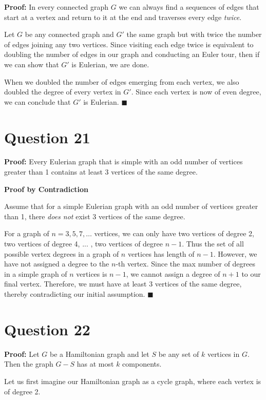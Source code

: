 \documentclass[11pt, oneside]{article}   	%
\newcommand*{\QEDA}{\hfill\ensuremath{\blacksquare}}         %
\begin{document}
{\textbf{Proof:} In every connected graph $G$ we can always find a sequences of edges that start at a vertex and return to it at the end and traverses every edge \textit{twice}.

Let $G$ be any connected graph and $G'$ the same graph but with twice the number of edges joining any two vertices. Since visiting each edge twice is equivalent to doubling the number of edges in our graph and conducting an Euler tour, then if we can show that $G'$ is Eulerian, we are done.

When we doubled the number of edges emerging from each vertex, we also doubled the degree of every vertex in $G'$. Since each vertex is now of even degree, we can conclude that $G'$ is Eulerian.  \QEDA


\section*{Question 21}

{\textbf{Proof:} Every Eulerian graph that is simple with an odd number of vertices greater than 1 contains at least 3 vertices of the same degree.

\textbf{Proof by Contradiction}

Assume that for a simple Eulerian graph with an odd number of vertices greater than 1, there \textit{does not} exist 3 vertices of the same degree.


For a graph of $n=3, 5, 7, \ldots$ vertices, we can only have two vertices of degree 2, two vertices of degree 4, ... , two vertices of degree $n-1$. Thus the set of all possible vertex degrees in a graph of $n$ vertices has length of $n-1$. However, we have not assigned a degree to the $n$-th vertex. Since the max number of degrees in a simple graph of $n$ vertices is $n-1$, we cannot assign a degree of $n+1$ to our final vertex. Therefore, we must have at least 3 vertices of the same degree, thereby contradicting our initial assumption. \QEDA


\section*{Question 22}

\textbf{Proof:} Let $G$ be a Hamiltonian graph and let $S$ be any set of $k$ vertices in $G$. Then the graph $G - S$ has at most $k$ components.

Let us first imagine our Hamiltonian graph as a cycle graph, where each vertex is of degree 2.

}}
\end{document}
